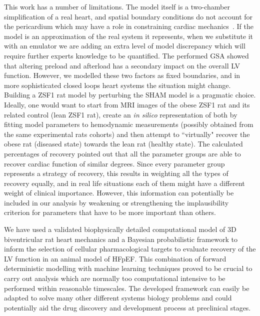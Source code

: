 \vspace{0.2cm}\noindent
{}

\noindent
This work has a number of limitations. The model itself is a two-chamber simplification of a real heart, and spatial boundary conditions do not account for the pericardium which may have a role in constraining cardiac mechanics~\cite{Strocchi:2020}. If the model is an approximation of the real system it represents, when we substitute it with an emulator we are adding an extra level of model discrepancy which will require further experts knowledge to be quantified. The performed GSA showed that altering preload and afterload has a secondary impact on the overall LV function. However, we modelled these two factors as fixed boundaries, and in more sophisticated closed loops heart systems the situation might change. Building a ZSF1 rat model by perturbing the SHAM model is a pragmatic choice. Ideally, one would want to start from MRI images of the obese ZSF1 rat and its related control (lean ZSF1 rat), create an \textit{in silico} representation of both by fitting model parameters to hemodynamic measurements (possibly obtained from the same experimental rats cohorts) and then attempt to ``virtually" recover the obese rat (diseased state) towards the lean rat (healthy state). The calculated percentages of recovery pointed out that all the parameter groups are able to recover cardiac function of similar degrees. Since every parameter group represents a strategy of recovery, this results in weighting all the types of recovery equally, and in real life situations each of them might have a different weight of clinical importance. However, this information can potentially be included in our analysis by weakening or strengthening the implausibility criterion for parameters that have to be more important than others.

\vspace{0.2cm}\noindent
{}

\noindent
We have used a validated biophysically detailed computational model of $3$D biventricular rat heart mechanics and a Bayesian probabilistic framework to inform the selection of cellular pharmacological targets to evaluate recovery of the LV function in an animal model of HFpEF. This combination of forward deterministic modelling with machine learning techniques proved to be crucial to carry out analysis which are normally too computational intensive to be performed within reasonable timescales. The developed framework can easily be adapted to solve many other different systems biology problems and could potentially aid the drug discovery and development process at preclinical stages.